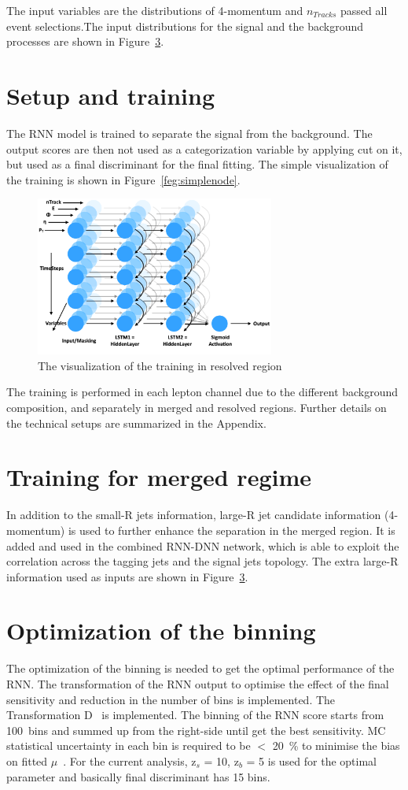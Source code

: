 The input variables are the distributions of  4-momentum and $n_{Tracks}$ passed all event selections.The input distributions for the signal and the background processes are shown in Figure~\ref{}.


\section{Setup and training}
The RNN model is trained to separate the signal from the background. The output scores are then not used as a categorization variable by applying cut on it, but used as a final discriminant for the final fitting.
The simple visualization of the training is shown in Figure~\ref{feg:simplenode}.
\begin{figure}[H]
    \centering
    \includegraphics[width=0.7\textwidth]{figures/simplenode}
    \caption{The visualization of the training in resolved region
    }
    \label{fig:simplenode}
\end{figure}

The training is performed in each lepton channel due to the different background composition, and separately in merged and resolved regions.
Further details on the technical setups are summarized in the Appendix.

\section{Training for merged regime}
In addition to the small-R jets information, large-R jet candidate information (4-momentum) is used to further enhance the separation in the merged region. It is added and used in the combined RNN-DNN network, which is able to exploit the correlation across the tagging jets and the signal jets topology.
The extra large-R information used as inputs are shown in Figure~\ref{}.

\section{Optimization of the binning}
The optimization of the binning is needed to get the optimal performance of the RNN. The transformation of the RNN output to optimise the effect of the final sensitivity and reduction in the number of bins is implemented.
The Transformation D~\cite{ATL-PHYS-PUB-2019-009} is implemented.
The binning of the RNN score starts from 100~bins and summed up from the right-side until get the best sensitivity. 
MC statistical uncertainty in each bin is required to be $<$ 20~\% to minimise the bias on fitted $\mu$~\cite{ATL-PHYS-PUB-2019-009}.
For the current analysis, z$_s$ = 10, z$_b$ = 5 is used for the optimal parameter and basically final discriminant has 15 bins.  